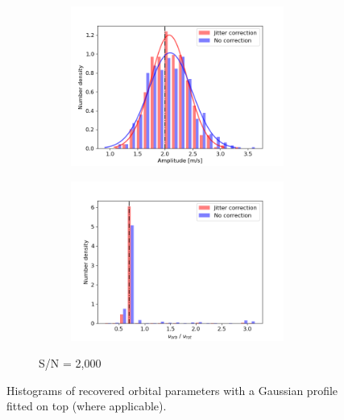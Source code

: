 \begin{figure}[tbp]
\begin{subfigure}[b]{1.0\textwidth}
    		\begin{subfigure}[b]{0.49\textwidth}
        		\includegraphics[width=\textwidth]{./Figures/Methods/Histogram_new1_p2_sn2000.png}
		\end{subfigure}
		\begin{subfigure}[b]{0.49\textwidth}        		
        		\includegraphics[width=\textwidth]{./Figures/Methods/Histogram_new2_p2_sn2000.png}
        	\end{subfigure}
        	\caption{S/N = 2,000}
    \end{subfigure}	       
    \caption[Histograms of recovered orbital parameters ($A = 2$~m/s)]
    {Histograms of recovered orbital parameters with a Gaussian profile fitted on top (where applicable).}
\label{fig:Histogram}
\end{figure}    

